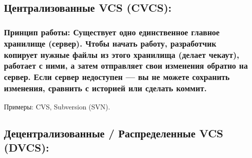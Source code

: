 \documentclass[
  english,
  russian,
  12pt,
  a4paper,
  DIV=11,
  numbers=noendperiod]{scrreprt}
\begin{document}
\subsection{Централизованные VCS
(CVCS):}\label{ux446ux435ux43dux442ux440ux430ux43bux438ux437ux43eux432ux430ux43dux43dux44bux435-vcs-cvcs}

\subsubsection{Принцип работы: Существует одно единственное главное
хранилище (сервер). Чтобы начать работу, разработчик копирует нужные
файлы из этого хранилища (делает чекаут), работает с ними, а затем
отправляет свои изменения обратно на сервер. Если сервер недоступен ---
вы не можете сохранить изменения, сравнить с историей или сделать
коммит.}\label{ux43fux440ux438ux43dux446ux438ux43f-ux440ux430ux431ux43eux442ux44b-ux441ux443ux449ux435ux441ux442ux432ux443ux435ux442-ux43eux434ux43dux43e-ux435ux434ux438ux43dux441ux442ux432ux435ux43dux43dux43eux435-ux433ux43bux430ux432ux43dux43eux435-ux445ux440ux430ux43dux438ux43bux438ux449ux435-ux441ux435ux440ux432ux435ux440.-ux447ux442ux43eux431ux44b-ux43dux430ux447ux430ux442ux44c-ux440ux430ux431ux43eux442ux443-ux440ux430ux437ux440ux430ux431ux43eux442ux447ux438ux43a-ux43aux43eux43fux438ux440ux443ux435ux442-ux43dux443ux436ux43dux44bux435-ux444ux430ux439ux43bux44b-ux438ux437-ux44dux442ux43eux433ux43e-ux445ux440ux430ux43dux438ux43bux438ux449ux430-ux434ux435ux43bux430ux435ux442-ux447ux435ux43aux430ux443ux442-ux440ux430ux431ux43eux442ux430ux435ux442-ux441-ux43dux438ux43cux438-ux430-ux437ux430ux442ux435ux43c-ux43eux442ux43fux440ux430ux432ux43bux44fux435ux442-ux441ux432ux43eux438-ux438ux437ux43cux435ux43dux435ux43dux438ux44f-ux43eux431ux440ux430ux442ux43dux43e-ux43dux430-ux441ux435ux440ux432ux435ux440.-ux435ux441ux43bux438-ux441ux435ux440ux432ux435ux440-ux43dux435ux434ux43eux441ux442ux443ux43fux435ux43d-ux432ux44b-ux43dux435-ux43cux43eux436ux435ux442ux435-ux441ux43eux445ux440ux430ux43dux438ux442ux44c-ux438ux437ux43cux435ux43dux435ux43dux438ux44f-ux441ux440ux430ux432ux43dux438ux442ux44c-ux441-ux438ux441ux442ux43eux440ux438ux435ux439-ux438ux43bux438-ux441ux434ux435ux43bux430ux442ux44c-ux43aux43eux43cux43cux438ux442.}

Примеры: CVS, Subversion (SVN).

\subsection{Децентрализованные / Распределенные VCS
(DVCS):}\label{ux434ux435ux446ux435ux43dux442ux440ux430ux43bux438ux437ux43eux432ux430ux43dux43dux44bux435-ux440ux430ux441ux43fux440ux435ux434ux435ux43bux435ux43dux43dux44bux435-vcs-dvcs}
\end{document}
